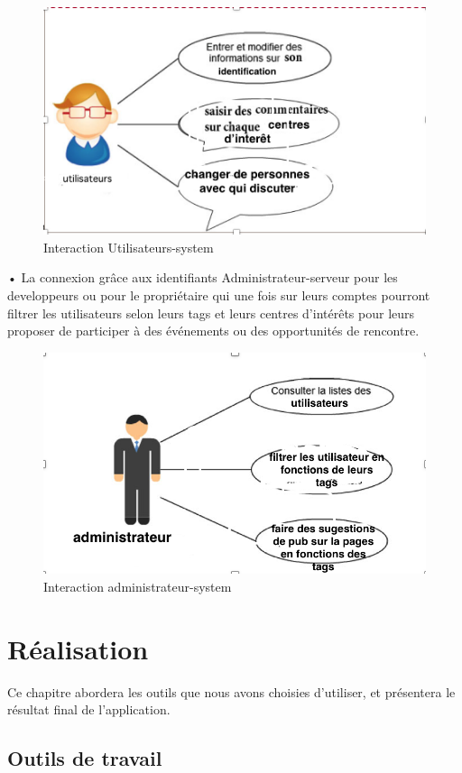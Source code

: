 \documentclass[oneside,12pt,a4paper]{book}
\begin{document}
\begin{figure}[ht]
\centering\includegraphics[width=0.7\linewidth]{interaction.png}
\caption{Interaction Utilisateurs-system}
\end{figure}
• La connexion grâce aux identifiants Administrateur-serveur pour les developpeurs ou pour le propriétaire qui une fois sur leurs comptes pourront filtrer les utilisateurs selon leurs tags et leurs centres d’intérêts pour leurs proposer de participer à des événements ou des opportunités de rencontre.

\begin{figure}[ht]
\centering\includegraphics[width=0.7\linewidth]{administrateur.png}
\caption{Interaction administrateur-system}
\end{figure}



\chapter{ Réalisation}
Ce chapitre abordera les outils que nous avons choisies d’utiliser, et présentera le résultat final de l’application.


\section{Outils de travail }
\end{document}
